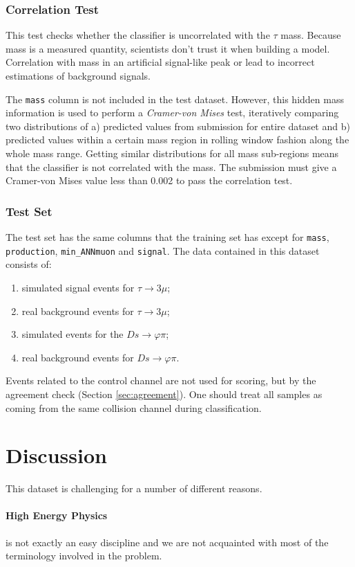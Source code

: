 \documentclass[11pt]{article}
\begin{document}
\subsubsection{Correlation Test}
\label{sec:correlation}
This test checks whether the classifier is uncorrelated with the $\tau$ mass.
Because mass is a measured quantity, scientists don't trust it when building a
model. Correlation with mass in an artificial signal-like peak or lead to
incorrect estimations of background signals.

The \texttt{mass} column is not included in the test dataset. However, this hidden
mass information is used to perform a \textit{Cramer-von Mises} test,
iteratively comparing two distributions of a) predicted values from submission
for entire dataset and b) predicted values within a certain mass region in
rolling window fashion along the whole mass range. Getting similar distributions
for all mass sub-regions means that the classifier is not correlated with the
mass. The submission must give a Cramer-von Mises value less than 0.002 to pass
the correlation test.

\subsubsection{Test Set}
\label{sec:test-set}
The test set has the same columns that the training set has except for
\texttt{mass}, \texttt{production}, \texttt{min\_ANNmuon} and \texttt{signal}.
The data contained in this dataset consists of:
\begin{enumerate}
	\item simulated signal events for $\tau \rightarrow 3\mu$;
	\item real background events for $\tau \rightarrow 3\mu$;
	\item simulated events for the $Ds \rightarrow \varphi\pi$;
	\item real background events for $Ds \rightarrow \varphi\pi$.
\end{enumerate}
Events related to the control channel are not used for scoring, but by the
agreement check (Section \ref{sec:agreement}). One should treat all samples as
coming from the same collision channel during classification.

\section{Discussion}
This dataset is challenging for a number of different reasons.
\paragraph{High Energy Physics} is not exactly an easy discipline and we are not
acquainted with most of the terminology involved in the problem.
\end{document}
